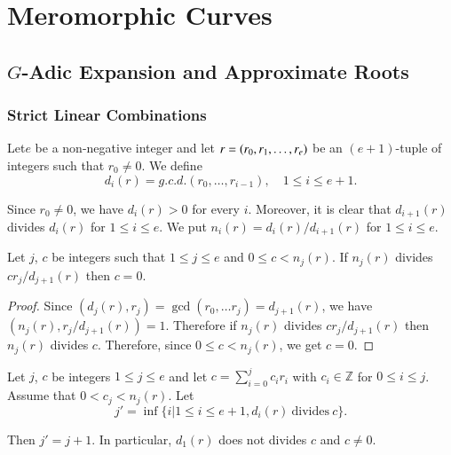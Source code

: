 
\part{Meromorphic Curves}\label{part1}

\chapter{$G$-Adic Expansion and Approximate Roots}\label{part1:chap1}

\section{Strict Linear Combinations}\label{part1:chap1:sec1}

\begin{notn}\label{part1:chap1:sec1:notn1.1} %
Let\pageoriginale $e$ be a non-negative integer and let $r=(r_0, r_1,\break
\ldots , r_e)$ be an $(e+1)$-tuple of integers such that $r_0 \neq
0$. We define 
$$
d_i (r)= g.c.d. (r_0, \ldots , r_{i-1}), \quad 1 \leq i \leq e+1. 
$$ 
\end{notn}

Since $r_0 \neq 0$, we have $d_i (r) > 0$ for every $i$. Moreover, it is clear that $d_{i+1} (r)$ divides $d_i (r)$ for $1 \leq i \leq e$. We put $n_i (r) = d_i (r) / d_{i+1} (r)$ for $1 \leq i \leq e$.

\begin{lemma}\label{part1:chap1:sec1:lem1.2} %
Let $j$, $c$ be integers such that $1\leq j \leq e$ and $0 \leq c < n_j (r)$. If $n_j (r)$ divides $cr_j / d_{j+1} (r)$ then $c=0$.
\end{lemma}

\begin{proof}
  Since \gcd $(d_j (r), r_j)= \gcd (r_0, \ldots r_j)= d_{j+1} (r)$, we have \gcd $(n_j (r),  r_j / d_{j+1}(r))=1$. Therefore if $n_j (r)$ divides $cr_j / d_{j+1} (r)$ then $n_j (r)$ divides $c$. Therefore, since $0 \leq c < n_j (r)$, we get $c=0$.
\end{proof}

\begin{lemma}\label{part1:chap1:sec1:lem1.3} %
  Let $j$, $c$ be integers $1 \leq j \leq e$ and let $c = \displaystyle{\sum^j_{i=0}} c_i r_i$ with $c_i \in \mathbb{Z}$ for $0 \leq i \leq j$. Assume that $0 < c_j < n_j (r)$. Let
$$
j' = \inf \Big\{ i \Big| 1 \leq i \leq e+1, d_i (r) ~\text{divides}~ c\Big\}.
$$
\end{lemma}

Then $j' = j+1$. In particular, $d_1 (r)$ does not divides $c$ and $c \neq 0$.

